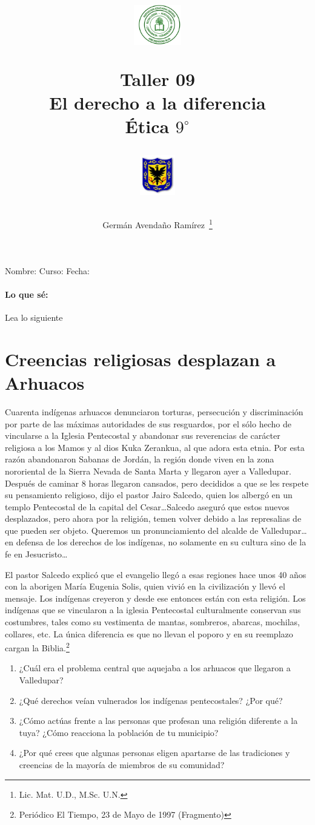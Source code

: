 \documentclass[10pt,twoside]{article}
\author{Germ\'an Avenda\~no Ram\'irez~\thanks{Lic. Mat. U.D., M.Sc. U.N.}}
\title{\begin{minipage}{.2\textwidth}
\includegraphics[height=1.75cm]{Images/logo-colegio.png}\end{minipage}
\begin{minipage}{.55\textwidth}
\begin{center}
Taller 09\\
El derecho a la diferencia\\
Ética $9^{\circ}$
\end{center}
\end{minipage}\hfill
\begin{minipage}{.2\textwidth}
\includegraphics[height=1.75cm]{Images/logo-sed.png} 
\end{minipage}}
\date{}
\begin{document}
\maketitle
Nombre: \hrulefill Curso: \underline{\hspace*{44pt}} Fecha: \underline{\hspace*{2.5cm}}
\paragraph*{Lo que s\'{e}:} Lea lo siguiente
\section*{Creencias religiosas desplazan a Arhuacos}
Cuarenta indígenas arhuacos denunciaron torturas, persecución y discriminación por parte de las máximas autoridades de sus resguardos, por el sólo hecho de vincularse a la Iglesia Pentecostal y abandonar sus reverencias de carácter religiosa a los Mamos y al dios Kuka Zerankua, al que adora esta etnia. Por esta razón abandonaron Sabanas de Jordán,
la región donde viven en la zona nororiental de la Sierra Nevada de Santa Marta y llegaron ayer a Valledupar. Después de caminar 8 horas llegaron cansados, pero decididos a que se les respete su pensamiento religioso, dijo el pastor Jairo Salcedo, quien los albergó en un templo Pentecostal de la capital del Cesar\ldots Salcedo aseguró que estos nuevos desplazados, pero ahora por la religión, temen volver debido a
las represalias de que pueden ser objeto. Queremos un pronunciamiento del alcalde de Valledupar\ldots en defensa de los derechos de los indígenas, no solamente en su cultura sino de la fe en Jesucristo\ldots

El pastor Salcedo explicó que el evangelio llegó a esas regiones hace unos 40 años con la aborigen María Eugenia Solis, quien vivió en la civilización y llevó el mensaje. Los indígenas creyeron y desde ese entonces están con esta religión. Los indígenas que se vincularon a la iglesia Pentecostal culturalmente conservan sus costumbres, tales como su vestimenta de mantas, sombreros, abarcas, mochilas, collares, etc. La única diferencia es que no llevan el poporo y en su reemplazo cargan la Biblia.\footnote{Periódico El Tiempo, 23 de Mayo de 1997 (Fragmento)}
\begin{enumerate}
\item ¿Cuál era el problema central que aquejaba a los arhuacos
que llegaron a Valledupar?
\item ¿Qué derechos veían vulnerados los indígenas pentecostales?
¿Por qué?
\item ¿Cómo actúas frente a las personas que profesan una religión
diferente a la tuya? ¿Cómo reacciona la población de tu municipio?
\item ¿Por qué crees que algunas personas eligen apartarse de las
tradiciones y creencias de la mayoría de miembros de su
comunidad?
\end{enumerate}
\end{document}
